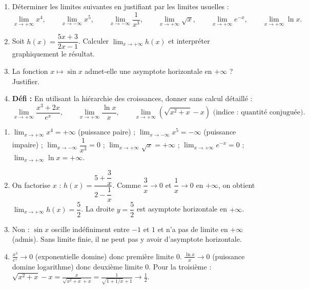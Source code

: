 \documentclass[11pt]{article}
\begin{document}
\begin{exercice}
\begin{enumerate}
\item Déterminer les limites suivantes en justifiant par les limites usuelles :
\[ \lim_{x \to +\infty} x^4, \qquad \lim_{x \to -\infty} x^5, \qquad \lim_{x \to -\infty} \frac{1}{x^3}, \qquad \lim_{x \to +\infty} \sqrt{x}, \qquad \lim_{x \to +\infty} e^{-x}, \qquad \lim_{x \to +\infty} \ln x. \]
\item Soit $h(x) = \dfrac{5x + 3}{2x - 1}$. Calculer $\lim_{x \to +\infty} h(x)$ et interpréter graphiquement le résultat.
\item La fonction $x \mapsto \sin x$ admet-elle une asymptote horizontale en $+\infty$ ? Justifier.
\item \textbf{Défi :} En utilisant la hiérarchie des croissances, donner sans calcul détaillé :
\[ \lim_{x \to +\infty} \frac{x^3 + 2x}{e^x}, \qquad \lim_{x \to +\infty} \frac{\ln x}{x}, \qquad \lim_{x \to +\infty} \left( \sqrt{x^2+x} - x \right) \text{ (indice : quantité conjuguée)}. \]
\end{enumerate}
\end{exercice}

\begin{corrige}
\begin{enumerate}
\item $\lim_{x \to +\infty} x^4 = +\infty$ (puissance paire) ; $\lim_{x \to -\infty} x^5 = -\infty$ (puissance impaire) ; $\lim_{x \to -\infty} \dfrac{1}{x^3} = 0$ ; $\lim_{x \to +\infty} \sqrt{x} = +\infty$ ; $\lim_{x \to +\infty} e^{-x} = 0$ ; $\lim_{x \to +\infty} \ln x = +\infty$.
\item On factorise $x$ : $h(x) = \dfrac{5 + \dfrac{3}{x}}{2 - \dfrac{1}{x}}$. Comme $\dfrac{3}{x} \to 0$ et $\dfrac{1}{x} \to 0$ en $+\infty$, on obtient $\lim_{x \to +\infty} h(x) = \dfrac{5}{2}$. La droite $y = \dfrac{5}{2}$ est asymptote horizontale en $+\infty$.
\item Non : $\sin x$ oscille indéfiniment entre $-1$ et $1$ et n'a pas de limite en $+\infty$ (admis). Sans limite finie, il ne peut pas y avoir d'asymptote horizontale.
\item $\frac{x^3}{e^x} \to 0$ (exponentielle domine) donc première limite $0$. $\frac{\ln x}{x} \to 0$ (puissance domine logarithme) donc deuxième limite $0$. Pour la troisième : $\sqrt{x^2+x} - x = \frac{x}{\sqrt{x^2+x}+x} = \frac{1}{\sqrt{1+1/x}+1} \to \frac{1}{2}$.
\end{enumerate}
\end{corrige}
\end{document}
